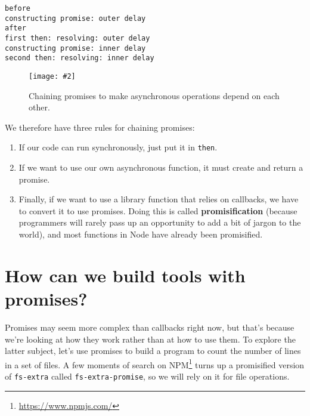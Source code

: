 \documentclass[krantzl]{krantz}
\newcommand{\figpdf}[4]{\begin{figure}%
\centering%
\texttt{[image: \#2]}%
\caption{#3}%
\label{#1}%
\end{figure}}
\newcommand{\glossref}[1]{\textbf{#1}}
\newcommand{\hreffoot}[2]{{#1}\footnote{\href{#2}{#2}}}
\begin{document}
\begin{lstlisting}[frame=tblr,backgroundcolor=\color{black!5}]
before
constructing promise: outer delay
after
first then: resolving: outer delay
constructing promise: inner delay
second then: resolving: inner delay
\end{lstlisting}


\figpdf{async-programming-chained}{./async-programming/chained.pdf}{Chaining promises to make asynchronous operations depend on each other.}{0.6}


We therefore have three rules for chaining promises:

\begin{enumerate}

\item 

If our code can run synchronously, just put it in \texttt{then}.



\item 

If we want to use our own asynchronous function,
    it must create and return a promise.



\item 

Finally,
    if we want to use a library function that relies on callbacks,
    we have to convert it to use promises.
    Doing this is called \glossref{promisification}
    (because programmers will rarely pass up an opportunity to add a bit of jargon to the world),
    and most functions in Node have already been promisified.



\end{enumerate}

\section{How can we build tools with promises?}\label{async-programming-tools}


Promises may seem more complex than callbacks right now,
but that’s because we’re looking at how they work rather than at how to use them.
To explore the latter subject,
let’s use promises to build a program to count the number of lines in a set of files.
A few moments of search on \hreffoot{NPM}{https://www.npmjs.com/} turns up a promisified version of \texttt{fs-extra}
called \texttt{fs-extra-promise},
so we will rely on it for file operations.
\end{document}
